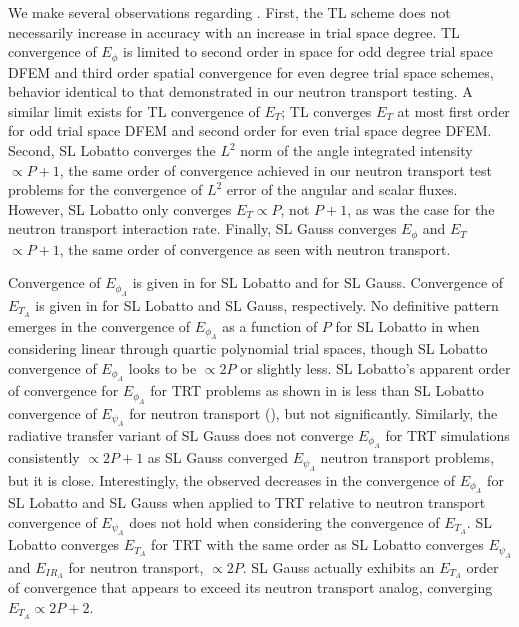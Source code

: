 We make several observations regarding .  
First, the TL scheme does not necessarily increase in accuracy with an increase in trial space degree.
TL convergence of $E_{\phi}$ is limited to second order in space for odd degree trial space DFEM and third order spatial convergence for even degree trial space schemes, behavior identical to that demonstrated in our neutron transport testing.
A similar limit exists for TL convergence of $E_T$; TL converges $E_T$ at most first order for odd trial space DFEM and second order for even trial space degree DFEM.
Second, SL Lobatto converges the $L^2$ norm of the angle integrated intensity $\propto P+1$, the same order of convergence achieved in our neutron transport test problems for the convergence of $L^2$ error of the angular and scalar fluxes.
However, SL Lobatto only converges $E_T \propto P$, not $P+1$, as was the case for the neutron transport interaction rate.
Finally, SL Gauss converges $E_{\phi}$ and $E_T$ $\propto P+1$, the same order of convergence as seen with neutron transport.

Convergence of $E_{\phi_A}$ is given in  for SL Lobatto and  for SL Gauss.
Convergence of $E_{T_A}$ is given in  for SL Lobatto and SL Gauss, respectively.
No definitive pattern emerges in the convergence of $E_{\phi_A}$ as a function of $P$ for SL Lobatto in  when considering linear through quartic polynomial trial spaces, though SL Lobatto convergence of $E_{\phi_A}$ looks to be $\propto 2P$ or slightly less.
SL Lobatto's apparent order of convergence for $E_{\phi_A}$ for TRT problems as shown in  is less than SL Lobatto convergence of $E_{\psi_A}$ for neutron transport (), but not significantly. 
Similarly, the radiative transfer variant of SL Gauss does not converge $E_{\phi_A}$ for TRT simulations consistently $\propto 2P+1$ as SL Gauss converged $E_{\psi_A}$ neutron transport problems,
but it is close.  
Interestingly, the observed decreases in the convergence of $E_{\phi_A}$ for SL Lobatto and SL Gauss when applied to TRT relative to neutron transport convergence of $E_{\psi_A}$ does not hold when considering the convergence of $E_{T_A}$.  
SL Lobatto converges $E_{T_A}$ for TRT with the same order as SL Lobatto converges $E_{\psi_A}$ and $E_{IR_A}$ for neutron transport, $\propto 2P$.
SL Gauss actually exhibits an $E_{T_A}$ order of convergence that appears to exceed its neutron transport analog, converging $E_{T_A} \propto 2P+2$. \

